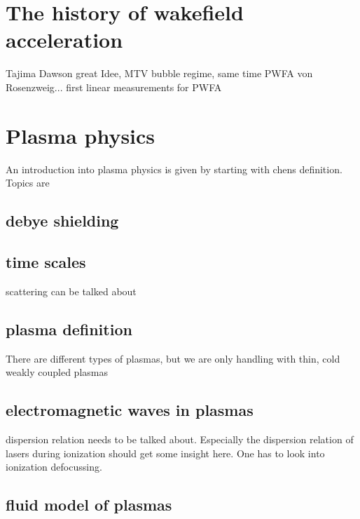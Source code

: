 %

\section{The history of wakefield acceleration}
Tajima Dawson great Idee, MTV bubble regime, same time PWFA von Rosenzweig... first linear measurements for PWFA
\section{Plasma physics}
An introduction into plasma physics is given by starting with chens definition. Topics are
\subsection{debye shielding}
\subsection{time scales}
scattering can be talked about

\subsection{plasma definition}
There are different types of plasmas, but we are only handling with thin, cold  weakly coupled plasmas
\subsection{electromagnetic waves in plasmas}
dispersion relation needs to be talked about. Especially the dispersion relation of lasers during ionization should get some insight here. One has to look into ionization defocussing.  
\subsection{fluid model of plasmas}
